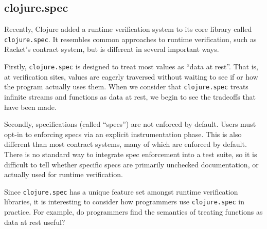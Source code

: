 




\subsection{clojure.spec}

Recently, Clojure added a runtime verification system to its core library called
\texttt{clojure.spec}.
It resembles common approaches to runtime verification, such as Racket's contract
system, but is different in several important ways.

Firstly, \texttt{clojure.spec} is designed to treat most values as ``data at rest''. That is,
at verification sites, values are eagerly traversed without waiting to see
if or how the program actually uses them.
When we consider that \texttt{clojure.spec} treats infinite streams
and functions as data at rest, we begin to see the tradeoffs that have been
made.

Secondly, specifications (called ``specs'') are not enforced by default. Users must
opt-in to enforcing specs via an explicit instrumentation phase.
This is also different than most contract systems, many of which are enforced
by default. There is no standard way to integrate spec enforcement into a
test suite, so it is difficult to tell whether specific specs are primarily 
unchecked documentation, or actually used for runtime verification.

Since \texttt{clojure.spec} has a unique feature set amongst runtime verification
libraries, it is interesting to consider how programmers use \texttt{clojure.spec}
in practice. For example, do programmers find the semantics of treating functions
as data at rest useful?

